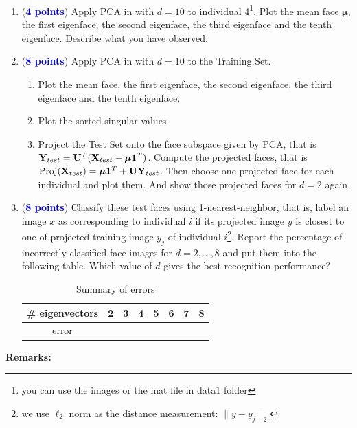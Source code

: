 \documentclass[english,onecolumn]{IEEEtran}
\newcommand{\bY}{{\bf Y}}
\newcommand{\bX}{{\bf X}}
\newcommand{\bmu}{{\boldsymbol \mu}}
\newcommand{\bone}{{\boldsymbol 1}}
\newcommand{\bU}{{\bf U}}
\begin{document}
\begin{enumerate}
    \item (\textcolor{blue}{\textbf{4 points}}) Apply PCA in  with $d = 10$ to individual 4\footnote{you can use the images or the mat file in data1 folder}. Plot the mean face $\bmu$, the first eigenface, the second eigenface, the third eigenface and the tenth eigenface. Describe what you have observed.
    \item (\textcolor{blue}{\textbf{8 points}}) Apply PCA in  with $d = 10$ to the Training Set. 
    \begin{enumerate}
        \item Plot the mean face, the first eigenface, the second eigenface, the third eigenface and the tenth eigenface.
        \item Plot the sorted singular values.
        \item Project the Test Set onto the face subspace given by PCA, that is $\bY_{test} = \bU^T(\bX_{test}-\bmu \bone^T)$. Compute the projected faces, that is $\text{Proj}(\bX_{test}) = \bmu \bone^T + \bU\bY_{test}$. Then choose one projected face for each individual and plot them. And show those projected faces for $d = 2$ again.
    \end{enumerate} 
    \item (\textcolor{blue}{\textbf{8 points}}) Classify these test faces using 1-nearest-neighbor, that is, label an image $x$ as corresponding to individual $i$ if its projected image $y$ is closest to one of projected training image $y_j$ of individual $i$\footnote{we use $\ell_2$ norm as the distance measurement: $ \|y-y_j\|_2$}. Report the percentage of incorrectly classified face images for $d = 2,...,8$ and put them into the following table. Which value of $d$ gives the best recognition performance?
    \begin{table}[h]
        \centering
        \caption{Summary of errors}
        \begin{tabular}{c|c|c|c|c|c|c|c}
        \# eigenvectors& 2 & 3& 4 & 5 & 6 & 7 & 8 \\ 
        \hline
            error &  &  &  &  &  &  &  
        \end{tabular}
        \label{tab:my_label}
    \end{table}
\end{enumerate}
{\bf Remarks:}
\end{document}
